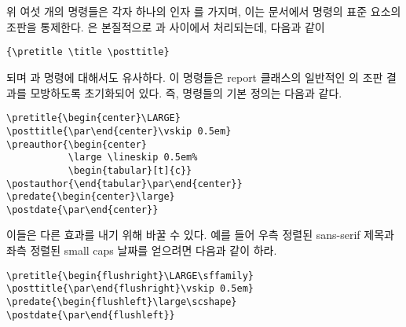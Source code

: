 \documentclass[10pt,a4paper]{oblivoir}
\begin{document}
\begin{tcolorbox}
\cmd{\pretitle} \cmd{\posttitle}\\
\cmd{\preauthor} \cmd{\postauthor}\\
\cmd{\predate} \cmd{\postdate}
\end{tcolorbox}
위 여섯 개의 명령들은 각자 하나의 인자 를 가지며, 이는 문서에서
\cmd{\maketitle} 명령의 표준 요소의 조판을 통제한다.
\cmd{\title}은 본질적으로 \cmd{\pretitle}과 \cmd{\posttitle} 사이에서
처리되는데, 다음과 같이
\begin{verbatim}
{\pretitle \title \posttitle}
\end{verbatim}
되며 \cmd{\author}과 \cmd{\date} 명령에 대해서도 유사하다.
이 명령들은 \textsf{report} 클래스의 일반적인 \cmd{\maketitle}의 조판 결과를
모방하도록 초기화되어 있다.
즉, 명령들의 기본 정의는 다음과 같다.
\begin{verbatim}
\pretitle{\begin{center}\LARGE}
\posttitle{\par\end{center}\vskip 0.5em}
\preauthor{\begin{center}
           \large \lineskip 0.5em%
           \begin{tabular}[t]{c}}
\postauthor{\end{tabular}\par\end{center}}
\predate{\begin{center}\large}
\postdate{\par\end{center}}
\end{verbatim}

이들은 다른 효과를 내기 위해 바꿀 수 있다.
예를 들어 우측 정렬된 sans-serif 제목과 좌측 정렬된 small caps 날짜를 얻으려면
다음과 같이 하라.
\begin{verbatim}
\pretitle{\begin{flushright}\LARGE\sffamily}
\posttitle{\par\end{flushright}\vskip 0.5em}
\predate{\begin{flushleft}\large\scshape}
\postdate{\par\end{flushleft}}
\end{verbatim}
\end{document}
